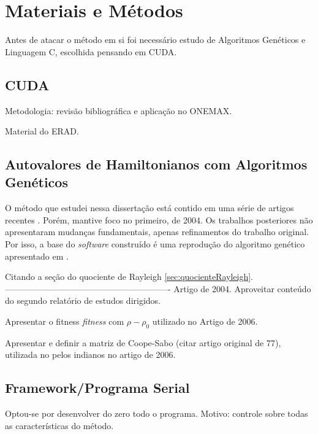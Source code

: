 \chapter{Materiais e Métodos\label{cap:metodologia}}

Antes de atacar o método em si foi necessário estudo de Algoritmos Genéticos e Linguagem C, escolhida pensando em CUDA.

\section{CUDA}

Metodologia: revisão bibliográfica e aplicação no ONEMAX.

Material do ERAD.

\section{Autovalores de Hamiltonianos com Algoritmos Genéticos\label{sec:metodo}}

	O método que estudei nessa dissertação está contido em uma série de artigos recentes \cite{metodo2004, metodo2006, metodo2008, metodo2009, metodo2011}. Porém, mantive foco no primeiro, de 2004. Os trabalhos posteriores não apresentaram mudanças fundamentais, apenas refinamentos do trabalho original. Por isso, a base do \emph{software} construído é uma reprodução do algoritmo genético apresentado em \cite{metodo2004}. 
	
	
	
	
	
	
	
	Citando a seção do quociente de Rayleigh \ref{sec:quocienteRayleigh}.
----------------------------------------------------------
	Artigo de 2004.	Aproveitar conteúdo do segundo relatório de estudos dirigidos.

	Apresentar o fitness \textit{fitness} com $\rho - \rho_0$ utilizado no Artigo de 2006.

	Apresentar e definir a matriz de Coope-Sabo (citar artigo original de 77), utilizada no pelos indianos no artigo de 2006.
	
\section{Framework/Programa Serial}

	Optou-se por desenvolver do zero todo o programa. Motivo: controle sobre todas as características do método.

